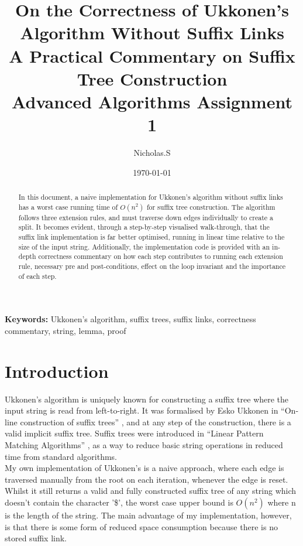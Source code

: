 \documentclass{article}
\title{On the Correctness of Ukkonen's Algorithm Without Suffix Links\\[0.5em] \large A Practical Commentary on Suffix Tree Construction\\ \small Advanced Algorithms Assignment 1}
\author{Nicholas.S}
\date{\today}
\begin{document}
	\maketitle
	\begin{abstract}
		In this document, a naive implementation for Ukkonen's algorithm without suffix links has a worst case running time of $O(n^2)$ for suffix tree construction.  The algorithm follows three extension rules, and must traverse down edges individually to create a split.  It becomes evident, through a step-by-step visualised walk-through, that the suffix link implementation is far better optimised, running in linear time relative to the size of the input string.  Additionally, the implementation code is provided with an in-depth correctness commentary on how each step contributes to running each extension rule, necessary pre and post-conditions, effect on the loop invariant and the importance of each step.
	\end{abstract}
	\noindent\textbf{Keywords: } Ukkonen's algorithm, suffix trees, suffix links, correctness commentary, string, lemma, proof
	
	\newpage
	\tableofcontents
	\newpage
	
	\section{Introduction}
	Ukkonen's algorithm is uniquely known for constructing a suffix tree where the input string is read from left-to-right.  It was formalised by Esko Ukkonen in ``On-line construction of suffix trees'' \cite{ukkonen1995}, and at any step of the construction, there is a valid implicit suffix tree. Suffix trees were introduced in ``Linear Pattern Matching Algorithms'' \cite{weiner1973}, as a way to reduce basic string operations in reduced time from standard algorithms. \\
	My own implementation of Ukkonen's is a naive approach, where each edge is traversed manually from the root on each iteration, whenever the edge is reset.  Whilst it still returns a valid and fully constructed suffix tree of any string which doesn't contain the character '\$', the worst case upper bound is $O(n^2)$ where n is the length of the string. The main advantage of my implementation, however, is that there is some form of reduced space consumption because there is no stored suffix link.
	
\end{document}
